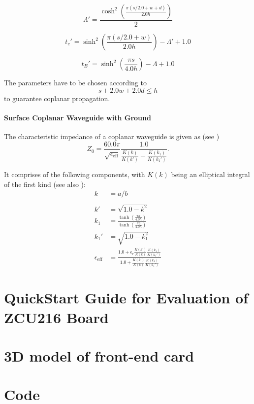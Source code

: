 \begin{equation}
	\Lambda' = \frac{\cosh^2 \left( \frac{\pi (s/2.0 + w + d)}{2.0 h} \right) }{2}
\end{equation}

\begin{equation}
	t_c' = \sinh^2 \left( \frac{\pi (s/2.0 + w)}{2.0 h} \right) - \Lambda' + 1.0
\end{equation}

\begin{equation}
	t_B' = \sinh^2 \left( \frac{\pi s}{4.0 h} \right) - \Lambda + 1.0
\end{equation}

The parameters have to be chosen according to 
\begin{equation}
	s + 2.0 w + 2.0 d \leq h
\end{equation}
to guarantee coplanar propagation. \cite{wadell}


\paragraph{Surface Coplanar Waveguide with Ground}  
The characteristic impedance of a coplanar waveguide is given as (see \cite{wadell}) 
\begin{equation}
	Z_0 = \frac{60.0 \pi}{\sqrt{\epsilon_\text{eff}}} \frac{1.0}{\frac{K(k)}{K(k')} + \frac{K(k_1)}{K(k_1')}}.
\end{equation}

It comprises of the following components, with $K(k)$ being an elliptical integral of the first kind (see also \cite[p.~430]{bronstein}):
\begin{align}
	k &= a/b\\\\
	k' &= \sqrt{1.0 - k^{2}}\\
	k_1 &= \frac{\tanh(\frac{\pi a}{4.0  h})}{\tanh(\frac{\pi  b}{4.0 h})}\\
	k_1' &= \sqrt{1.0 - k_1^{2}}\\
	\epsilon_\text{eff} &= \frac{1.0 + \epsilon_r \frac{K(k')}{K(k)} \frac{K(k_1)}{K(k_1')}}{1.0 + \frac{K(k')}{K(k)} \frac{K(k_1)}{K(k_1')}}
\end{align}




\section{QuickStart Guide for Evaluation of ZCU216 Board}
\section{3D model of front-end card}
\section{Code}

